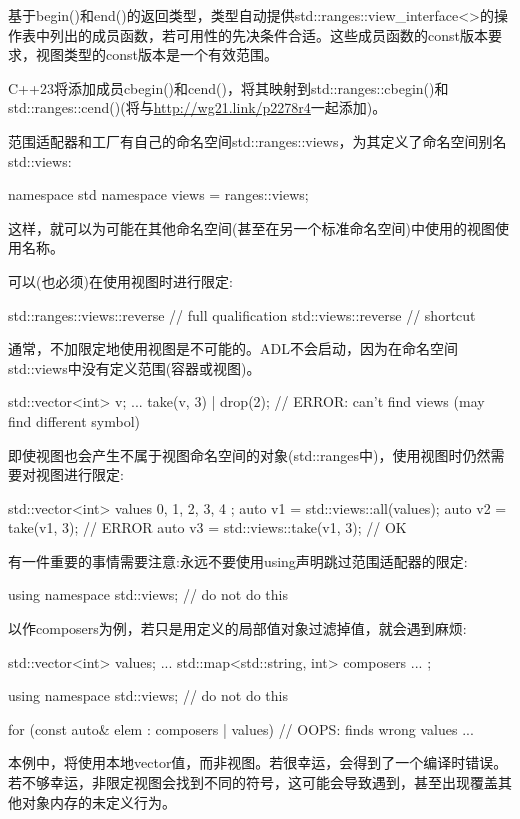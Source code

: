 基于begin()和end()的返回类型，类型自动提供std::ranges::view\_interface<>的操作表中列出的成员函数，若可用性的先决条件合适。这些成员函数的const版本要求，视图类型的const版本是一个有效范围。

C++23将添加成员cbegin()和cend()，将其映射到std::ranges::cbegin()和std::ranges::cend()(将与\url{http://wg21.link/p2278r4}一起添加)。


范围适配器和工厂有自己的命名空间std::ranges::views，为其定义了命名空间别名std::views:

\begin{cpp}
namespace std {
	namespace views = ranges::views;
}
\end{cpp}

这样，就可以为可能在其他命名空间(甚至在另一个标准命名空间)中使用的视图使用名称。

可以(也必须)在使用视图时进行限定:

\begin{cpp}
std::ranges::views::reverse // full qualification
std::views::reverse // shortcut
\end{cpp}

通常，不加限定地使用视图是不可能的。ADL不会启动，因为在命名空间std::views中没有定义范围(容器或视图)。

\begin{cpp}
std::vector<int> v;
...
take(v, 3) | drop(2); // ERROR: can’t find views (may find different symbol)
\end{cpp}

即使视图也会产生不属于视图命名空间的对象(std::ranges中)，使用视图时仍然需要对视图进行限定:

\begin{cpp}
std::vector<int> values{ 0, 1, 2, 3, 4 };
auto v1 = std::views::all(values);
auto v2 = take(v1, 3); // ERROR
auto v3 = std::views::take(v1, 3); // OK
\end{cpp}

有一件重要的事情需要注意:永远不要使用using声明跳过范围适配器的限定:

\begin{cpp}
using namespace std::views; // do not do this
\end{cpp}

以作composers为例，若只是用定义的局部值对象过滤掉值，就会遇到麻烦:

\begin{cpp}
std::vector<int> values;
...
std::map<std::string, int> composers{ ... };

using namespace std::views; // do not do this

for (const auto& elem : composers | values) { // OOPS: finds wrong values
	...
}
\end{cpp}

本例中，将使用本地vector值，而非视图。若很幸运，会得到了一个编译时错误。若不够幸运，非限定视图会找到不同的符号，这可能会导致遇到，甚至出现覆盖其他对象内存的未定义行为。
